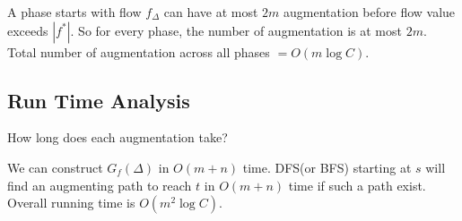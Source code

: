 A phase starts with flow $f_{\Delta}$ can have at most $2m$ augmentation before flow value exceeds $|f^*|$. So for every phase, the number of augmentation is at most $2m$. Total number of augmentation across all phases $ = O(m \log C)$.


\subsection{Run Time Analysis}
How long does each augmentation take? 

We can construct $G_f(\Delta)$ in $O(m+n)$ time. DFS(or BFS) starting at $s$ will find an augmenting path to reach $t$ in $O(m+n)$ time if such a path exist. Overall running time is $O(m^2\log C)$.


